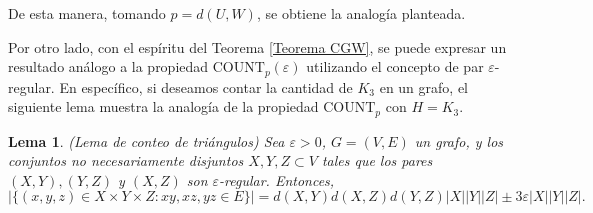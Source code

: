 \documentclass{article}[14pts]
\newtheorem{lema}{Lema}
\newcommand{\Count}{\mathrm{COUNT}}
\let\varepsilon=\varepsilon
\begin{document}
De esta manera, tomando $p = d(U,W)$, se obtiene la analogía planteada.\medskip

Por otro lado, con el espíritu del Teorema \ref{Teorema CGW}, se puede expresar un resultado análogo a la propiedad $\Count_p(\varepsilon)$ utilizando el concepto de par $\varepsilon$-regular. En específico, si deseamos contar la cantidad de $K_3$ en un grafo, el siguiente lema muestra la analogía de la propiedad $\Count_p$ con $H = K_3$.\medskip

\begin{lema} \label{Triangle_Counting_Lemma} (Lema de conteo de triángulos)
    Sea $\varepsilon > 0$, $G = (V,E)$ un grafo, y los conjuntos no necesariamente disjuntos $X,Y,Z\subset V$ tales que los pares $(X,Y), (Y,Z)$ y $(X,Z)$ son $\varepsilon$-regular. Entonces,
    \begin{equation*}
        |\lbrace (x,y,z)\in X\times Y\times Z : xy,xz,yz\in E\rbrace| = d(X,Y)d(X,Z)d(Y,Z)|X||Y||Z| \pm 3\varepsilon |X||Y||Z|.
    \end{equation*}
\end{lema}
\end{document}
